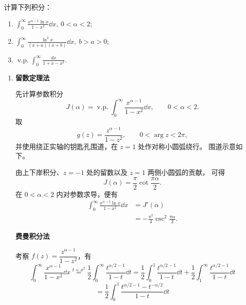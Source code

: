 
\begin{question}
计算下列积分：

\begin{enumerate}
  \item \(\displaystyle\int_0^\infty \frac{x^{\alpha - 1} \ln x}{1-x^2}\dd{x},\ 0<\alpha<2\);

  \item \(\displaystyle\int_0^\infty \frac{\ln^2 x}{(x+a)(x+b)}\dd{x},\ b>a>0\);

  \item \(\displaystyle\operatorname{v.p.}\int_0^\infty \frac{dx}{1+x-x^2}\).
\end{enumerate}
\begin{solution}
\begin{enumerate}
  \item
\textbf{留数定理法}\par

先计算参数积分
\[
J(\alpha)=\operatorname{v.p.}\int_0^\infty
\frac{x^{\alpha-1}}{1-x^2}\dd{x},
\qquad 0<\alpha<2.
\]
取
\[
g(z)=\frac{z^{\alpha-1}}{1-z^2},
\qquad 0<\arg z<2\pi,
\]
并使用绕正实轴的钥匙孔围道，在 \(z=1\) 处作对称小圆弧绕行。
围道示意如下。
\begin{center}
\end{center}
由上下岸积分、\(z=-1\) 处的留数以及 \(z=1\) 两侧小圆弧的贡献，
可得
\[
J(\alpha)=\frac{\pi}{2}\cot\frac{\pi\alpha}{2}.
\]
在 \(0<\alpha<2\) 内对参数求导，便有
\[
\begin{aligned}
\int_0^\infty\frac{x^{\alpha-1}\ln x}{1-x^2}\dd{x}
&=J'(\alpha)\\
&=-\frac{\pi^2}{4}\csc^2\frac{\pi\alpha}{2}.
\end{aligned}
\]

\textbf{费曼积分法}\par

考察 \(f(z) = \dfrac{z^{\alpha-1}}{1-z^2}\)，有 \[ \int_0^\infty \frac{x^{\alpha-1}}{1-x^2}\dd{x}\overset{t=x^2}{=} \frac12\int_0^\infty \frac{t^{\alpha/2-1}}{1-t}\dd{t}=\frac12 \int_0^1 \frac{t^{\alpha/2-1}}{1-t}\dd{t}+\frac12 \int_1^\infty \frac{t^{\alpha/2-1}}{1-t}\dd{t} \] \[ =\frac12 \int_0^1 \frac{t^{\alpha/2-1}-t^{-\alpha/2}}{1-t}\dd{t} \]


\end{enumerate}
\end{solution}
\end{question}
